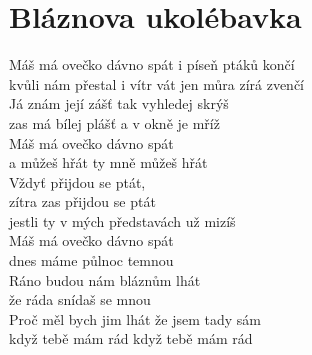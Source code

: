 \section{Bláznova ukolébavka}
\onehalfspacing

Máš má ovečko dávno spát i píseň ptáků končí\\
kvůli nám přestal i vítr vát jen můra zírá zvenčí\\
Já znám její zášť tak vyhledej skrýš \\
zas má bílej plášť a v okně je mříž\\

{}Máš má ovečko dávno spát \\
a můžeš hřát ty mně můžeš hřát \\
Vždyť přijdou se ptát, \\
zítra zas přijdou se ptát \\
jestli ty v mých představách už mizíš\\

\sloka
Máš má ovečko dávno spát \\
dnes máme půlnoc temnou\\
Ráno budou nám bláznům lhát \\
že ráda snídaš se mnou\\
Proč měl bych jim lhát že jsem tady sám\\
když tebě mám rád když tebě mám rád\\


